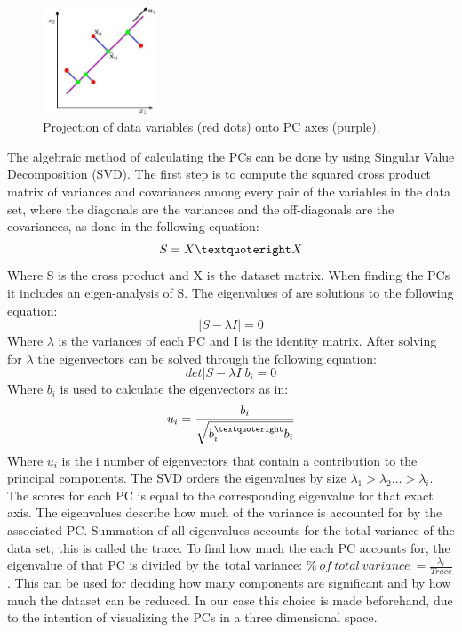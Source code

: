 \begin{figure}[H] 
	\includegraphics[width=0.3\textwidth]{figures/zASP/projection}
	\caption{Projection of data variables (red dots) onto PC axes (purple).}
	\label{projection}
\end{figure}
\vspace{-10pt}
The algebraic method of calculating the PCs can be done by using Singular Value Decomposition (SVD). The first step is to compute the squared cross product matrix of variances and covariances among every pair of the variables in the data set, where the diagonals are the variances and the off-diagonals are the covariances, as done in the following equation:
\begin{equation}
S = X \textquoteright X
\end{equation}
Where S is the cross product and X is the dataset matrix. When finding the PCs it includes an eigen-analysis of S. The eigenvalues of are solutions to the following equation:
\begin{equation}
| S - \lambda I |  = 0
\end{equation}
Where $\lambda$ is the variances of each PC and I is the identity matrix. After solving for $\lambda$ the eigenvectors can be solved through the following equation:
\begin{equation}
det | S - \lambda I | b_{i} = 0
\end{equation}
Where $b_{i}$ is used to calculate the eigenvectors as in:
\begin{eqnarray}
u_{i} = \frac{b_{i}}{\sqrt{b_{i}^{\textquoteright} b_{i}}}
\end{eqnarray}
Where $u_{i}$ is the i number of eigenvectors that contain a contribution to the principal components.
The SVD orders the eigenvalues by size $\lambda_{1} > \lambda_{2} … > \lambda_{i}$. The scores for each PC is equal to the corresponding eigenvalue for that exact axis. The eigenvalues describe how much of the variance is accounted for by the associated PC. Summation of all eigenvalues accounts for the total variance of the data set; this is called the trace. To find how much the each PC accounts for, the eigenvalue of that PC is divided by the total variance: $\%~ of~ total~ variance~ = \frac{\lambda_{i}}{Trace}$. This can be used for deciding how many components are significant and by how much the dataset can be reduced. In our case this choice is made beforehand, due to the intention of visualizing the PCs in a three dimensional space. 